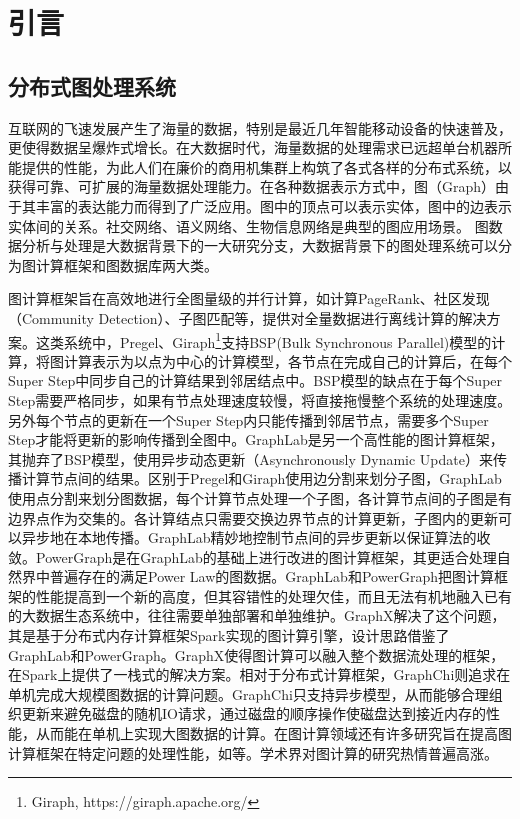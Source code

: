 
\chapter{引言}

\section{分布式图处理系统}
互联网的飞速发展产生了海量的数据，特别是最近几年智能移动设备的快速普及，更使得数据呈爆炸式增长。在大数据时代，海量数据的处理需求已远超单台机器所能提供的性能，为此人们在廉价的商用机集群上构筑了各式各样的分布式系统，以获得可靠、可扩展的海量数据处理能力。在各种数据表示方式中，图（Graph）由于其丰富的表达能力而得到了广泛应用。图中的顶点可以表示实体，图中的边表示实体间的关系。社交网络、语义网络、生物信息网络是典型的图应用场景。
图数据分析与处理是大数据背景下的一大研究分支\supercite{big_data}，大数据背景下的图处理系统可以分为图计算框架和图数据库两大类。

图计算框架旨在高效地进行全图量级的并行计算，如计算PageRank\supercite{pagerank}、社区发现\supercite{community_detection}（Community Detection）、子图匹配\supercite{subgraph_listing}等，提供对全量数据进行离线计算的解决方案。这类系统中，Pregel\supercite{pregel}、Giraph\footnote{Giraph, https://giraph.apache.org/}支持BSP\supercite{BSP}(Bulk Synchronous Parallel)模型的计算，将图计算表示为以点为中心的计算模型，各节点在完成自己的计算后，在每个Super Step中同步自己的计算结果到邻居结点中。BSP模型的缺点在于每个Super Step需要严格同步，如果有节点处理速度较慢，将直接拖慢整个系统的处理速度。另外每个节点的更新在一个Super Step内只能传播到邻居节点，需要多个Super Step才能将更新的影响传播到全图中。GraphLab\supercite{graphlab}是另一个高性能的图计算框架，其抛弃了BSP模型，使用异步动态更新（Asynchronously Dynamic Update）来传播计算节点间的结果。区别于Pregel和Giraph使用边分割来划分子图，GraphLab使用点分割来划分图数据，每个计算节点处理一个子图，各计算节点间的子图是有边界点作为交集的。各计算结点只需要交换边界节点的计算更新，子图内的更新可以异步地在本地传播。GraphLab精妙地控制节点间的异步更新以保证算法的收敛。PowerGraph\supercite{powergraph}是在GraphLab的基础上进行改进的图计算框架，其更适合处理自然界中普遍存在的满足Power Law的图数据。GraphLab和PowerGraph把图计算框架的性能提高到一个新的高度，但其容错性的处理欠佳，而且无法有机地融入已有的大数据生态系统中，往往需要单独部署和单独维护。GraphX\supercite{graphx}解决了这个问题，其是基于分布式内存计算框架Spark\supercite{spark}实现的图计算引擎，设计思路借鉴了GraphLab和PowerGraph。GraphX使得图计算可以融入整个数据流处理的框架，在Spark上提供了一栈式的解决方案。相对于分布式计算框架，GraphChi\supercite{graphchi}则追求在单机完成大规模图数据的计算问题。GraphChi只支持异步模型，从而能够合理组织更新来避免磁盘的随机IO请求，通过磁盘的顺序操作使磁盘达到接近内存的性能，从而能在单机上实现大图数据的计算。在图计算领域还有许多研究旨在提高图计算框架在特定问题的处理性能，如\supercites{xuning_LogGP,xuning_2,shaoxia_1,shaoxia_2,shaoxia_3}等。学术界对图计算的研究热情普遍高涨。

